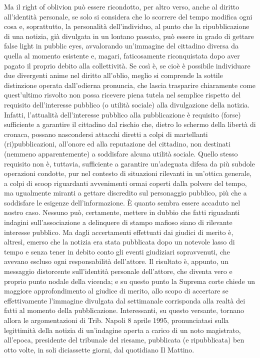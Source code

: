 Ma il right of oblivion può essere ricondotto, per altro verso, anche al diritto all’identità personale, se solo si considera che lo scorrere del tempo modifica ogni cosa e, soprattutto, la personalità dell’individuo, al punto che la ripubblicazione di una notizia, già divulgata in un lontano passato, può essere in grado di gettare false light in pubblic eyes, avvalorando un’immagine del cittadino diversa da quella al momento esistente e, magari, faticosamente riconquistata dopo aver pagato il proprio debito alla collettività.
Se così è, se cioè è possibile individuare due divergenti anime nel diritto all’oblio, meglio si comprende la sottile distinzione operata dall’odierna pronuncia, che lascia trasparire chiaramente come quest’ultimo risvolto non possa ricevere piena tutela nel semplice rispetto del requisito dell’interesse pubblico (o utilità sociale) alla divulgazione della notizia.
Infatti, l’attualità dell’interesse pubblico alla pubblicazione è requisito (forse) sufficiente a garantire il cittadino dal rischio che, dietro lo schermo della libertà di cronaca, possano nascondersi attacchi diretti a colpi di martellanti (ri)pubblicazioni, all’onore ed alla reputazione del cittadino, non destinati (nemmeno apparentemente) a soddisfare alcuna utilità sociale.
Quello stesso requisito non è, tuttavia, sufficiente a garantire un’adeguata difesa da più subdole operazioni condotte, pur nel contesto di situazioni rilevanti in un’ottica generale, a colpi di scoop riguardanti avvenimenti ormai coperti dalla polvere del tempo, ma ugualmente miranti a gettare discredito sul personaggio pubblico, più che a soddisfare le esigenze dell’informazione. È quanto sembra essere accaduto nel nostro caso.
Nessuno può, certamente, mettere in dubbio che fatti riguadanti indagini sull’associazione a delinquere di stampo mafioso siano di rilevante interesse pubblico.
Ma dagli accertamenti effettuati dai giudici di merito è, altresì, emerso che la notizia era stata pubblicata dopo un notevole lasso di tempo e senza tener in debito conto gli eventi giudiziari sopravvenuti, che avevano escluso ogni responsabilità dell’attore.
Il risultato è, appunto, un messaggio distorcente sull’identità personale dell’attore, che diventa vero e proprio punto nodale della vicenda; e su questo punto la Suprema corte chiede un maggiore approfondimento al giudice di merito, allo scopo di accertare se effettivamente l’immagine divulgata dal settimanale corrisponda alla realtà dei fatti al momento della pubblicazione.
Interessanti, su questo versante, tornano allora le argomentazioni di Trib. Napoli 8 aprile 1995, pronunciatasi sulla legittimità della notizia di un’indagine aperta a carico di un noto magistrato, all’epoca, presidente del tribunale del riesame, pubblicata (e ripubblicata) ben otto volte, in soli diciassette giorni, dal quotidiano Il Mattino.
